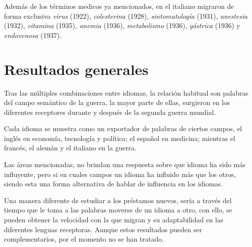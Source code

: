 Además de los términos medicos ya mencionados, en el italiano migraron de forma  exclusiva  \textit{virus} (1922), \textit{colesterina} (1928),  \textit{sintomatología} (1931), \textit{anestesia} (1932), \textit{vitamina} (1935), \textit{anemia} (1936), \textit{metabolismo} (1936),  \textit{gástrica} (1936)  y \textit{endovenosa} (1937).  







\section{Resultados generales}%



Tras las múltiples combinaciones entre idiomas, la relación habitual son palabras del campo semántico de la guerra, la mayor parte de ellas, surgieron en los diferentes receptores durante y después de la segunda guerra mundial. 

Cada idioma se muestra como un exportador de palabras de ciertos campos,  el inglés en economía, tecnología y política; el español en medicina; mientras el francés, el alemán y el italiano en la guerra.  

Las áreas mencionadas, no brindan una respuesta sobre que idioma ha sido más influyente, pero si en cuales campos un idioma ha influido más que los otros, siendo esta una forma alternativa de hablar de influencia en los idiomas.
 
Una manera diferente de estudiar a los préstamos nuevos, sería a través del tiempo que le toma a las palabras moverse de un idioma a otro, con ello, se pueden obtener la velocidad con la que migran y su adaptabilidad en las diferentes lenguas receptoras. Aunque estos resultados pueden ser complementarios, por el momento no se han tratado. 



